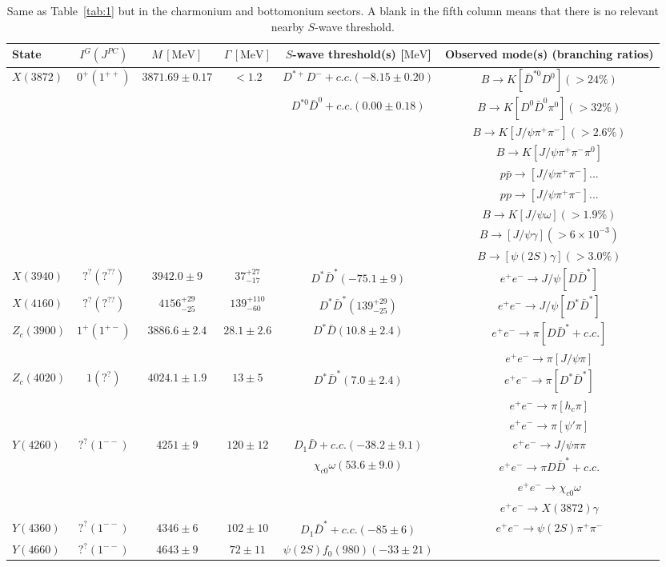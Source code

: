  \begin{table*}
 \caption{Same as Table~\ref{tab:1} but in the 
 charmonium and bottomonium sectors. A blank in the fifth column means that 
 there is no relevant nearby $S$-wave threshold. 
}
\begin{ruledtabular}
 \begin{tabular}{l  c c c c c }
State & $I^G(J^{PC})$ & $M\,[\mathrm{MeV}]$ & $\Gamma\,[\mathrm{MeV}]$ &
$S$-wave threshold(s) [$\mathrm{MeV}$] & Observed mode(s) (branching
ratios)\tabularnewline
\hline
$X(3872)$ & $0^{+}(1^{++})$ & $3871.69\pm0.17$ & $<1.2$ & $D^{*+}D^{-}+c.c.(-8.15\pm0.20)$ & $B\to K[\bar{D}^{*0}D^{0}](>24\%)$\tabularnewline
 &  &  &  & $D^{*0}\bar{D}^{0}+c.c.(0.00\pm0.18)$ & $B\to
 K[D^{0}\bar{D}^{0}\pi^{0}](>32\%)$\tabularnewline &  &  &  &  & $B\to K[J/\psi\pi^{+}\pi^{-}](>2.6\%)$\tabularnewline
 &  &  &  &  & $B\to K[J/\psi\pi^{+}\pi^{-}\pi^{0}]$\tabularnewline
 &  &  &  &  & $p\bar{p}\to[J/\psi\pi^{+}\pi^{-}]...$\tabularnewline
 &  &  &  &  & $pp\to[J/\psi\pi^{+}\pi^{-}]...$\tabularnewline
 &  &  &  &  & $B\to K[J/\psi\omega](>1.9\%)$\tabularnewline
 &  &  &  &  & $B\to[J/\psi\gamma](>6\times10^{-3})$\tabularnewline
 &  &  &  &  & $B\to[\psi(2S)\gamma](>3.0\%)$\tabularnewline
\hline
$X(3940)$ & $?^{?}(?^{??})$ & $3942.0\pm9$ & $37_{-17}^{+27}$ & $D^{*}\bar{D}^{*}(-75.1\pm 9)$ & $e^{+}e^{-}\to
J/\psi[D\bar{D}^{*}]$\tabularnewline
\hline
$X(4160)$ & $?^{?}(?^{??})$ & $4156_{-25}^{+29}$ & $139_{-60}^{+110}$ & $D^{*}\bar{D}^{*}(139_{-25}^{+29})$ & $e^{+}e^{-}\to
J/\psi[D^{*}\bar{D}^{*}]$\tabularnewline
\hline
$Z_{c}(3900)$ & $1^{+}(1^{+-})$ & $3886.6\pm2.4$ & $28.1\pm2.6$ & $D^{*}\bar{D}(10.8\pm2.4)$ &
$e^{+}e^{-}\to\pi[D\bar{D}^{*}+c.c.]$\tabularnewline
 &  &  &  &  & $e^{+}e^{-}\to\pi[J/\psi\pi]$\tabularnewline
\hline
$Z_{c}(4020)$ & $1(?^{?})$ & $4024.1\pm1.9$ & $13\pm5$ & $D^{*}\bar{D}^{*}(7.0\pm 2.4)$ & $e^{+}e^{-}\to\pi[D^{*}\bar{D}^{*}]$\tabularnewline
 &  &  &  &  & $e^{+}e^{-}\to\pi[h_{c}\pi]$\tabularnewline
 &  &  &  &  & $e^{+}e^{-}\to\pi[\psi'\pi]$\tabularnewline
\hline
$Y(4260)$ & $?^{?}(1^{--})$ & $4251\pm9$ & $120\pm12$ & 
$D_{1}\bar{D}+c.c.(-38.2\pm 9.1)$ & $e^{+}e^{-}\to 
J/\psi\pi\pi$\tabularnewline
 &  &  &  & $\chi_{c0}\omega(53.6\pm 9.0)$ & $e^{+}e^{-}\to
 \pi D\bar D^* +c.c.$\tabularnewline 
  &  &  &  &  & $e^{+}e^{-}\to \chi_{c0}\omega$\tabularnewline
 &  &  &  &  & $e^{+}e^{-}\to
 X(3872)\gamma$\tabularnewline
\hline
$Y(4360)$ & $?^{?}(1^{--})$ & $4346\pm6$ & $102\pm10$ & $D_{1}\bar{D}^{*}+c.c.(-85\pm6)$ &
$e^{+}e^{-}\to\psi(2S)\pi^{+}\pi^{-}$\tabularnewline
\hline
$Y(4660)$ & $?^{?}(1^{--})$ & $4643\pm9$ & $72\pm11$ & $\psi(2S)f_{0}(980)(-33\pm21)$ &

\end{tabular}
\end{ruledtabular}
\end{table*}

